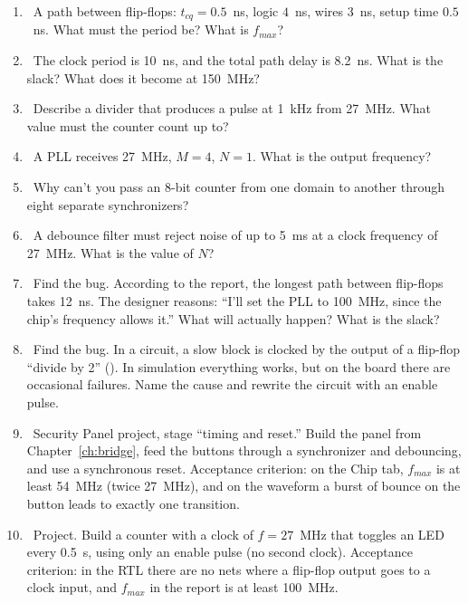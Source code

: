 \begin{taskbox}
\begin{enumerate}
  \item {}~A path between flip-flops: $t_{cq}=0.5$~ns, logic $4$~ns, wires $3$~ns,
        setup time $0.5$~ns. What must the period be? What is $f_{max}$?
  \item {}~The clock period is 10~ns, and the total path delay is 8.2~ns. What is the slack?
        What does it become at 150~MHz?
  \item {}~Describe a divider that produces a  pulse at 1~kHz
        from 27~MHz. What value must the counter count up to?
  \item {}~A PLL receives 27~MHz, $M=4$, $N=1$. What is the output frequency?
  \item {}~Why can't you pass an 8-bit counter from one domain to another
        through eight separate synchronizers?
  \item {}~A debounce filter must reject noise of up to 5~ms at a clock frequency of
        27~MHz. What is the value of $N$?
  \item {}~Find the bug. According to the report, the longest path between flip-flops takes 12~ns.
        The designer reasons: ``I'll set the PLL to 100~MHz, since the chip's frequency allows it.''
        What will actually happen? What is the slack?
  \item {}~Find the bug. In a circuit, a slow block is clocked by the output of a flip-flop
        ``divide by 2'' (). In simulation everything works, but on the board
        there are occasional failures. Name the cause and rewrite the circuit with an enable pulse.
  \item {}~Security Panel project, stage ``timing and reset.'' Build the panel from Chapter~\ref{ch:bridge},
        feed the buttons through a synchronizer and debouncing, and use a synchronous reset. Acceptance
        criterion: on the Chip tab, $f_{max}$ is at least 54~MHz (twice 27~MHz), and on the waveform
        a burst of bounce on the button leads to exactly one transition.
  \item {}~Project. Build a counter with a clock of $f=27$~MHz that toggles an LED every 0.5~s,
        using only an enable pulse (no second clock). Acceptance criterion:
        in the RTL there are no nets where a flip-flop output goes to a clock input, and $f_{max}$ in the report
        is at least 100~MHz.
\end{enumerate}
\end{taskbox}
